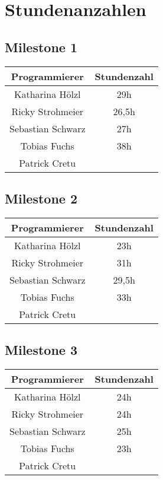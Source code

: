 \chapter{Stundenanzahlen}
\section{Milestone 1}
\begin{center}
	\begin{tabular}{|c|c|}
		\hline \textbf{Programmierer} & \textbf{Stundenzahl} \\ 
		\hline Katharina Hölzl  & 29h \\ 
		\hline Ricky Strohmeier & 26,5h \\ 
		\hline Sebastian Schwarz & 27h \\ 
		\hline Tobias Fuchs &  38h\\ 
		\hline Patrick Cretu &  \\ 
		\hline 
	\end{tabular}
\end{center} 
\section{Milestone 2}
\begin{center}
	\begin{tabular}{|c|c|}
		\hline \textbf{Programmierer} & \textbf{Stundenzahl} \\ 
		\hline Katharina Hölzl  & 23h  \\ 
		\hline Ricky Strohmeier & 31h\\ 
		\hline Sebastian Schwarz & 29,5h \\ 
		\hline Tobias Fuchs & 33h \\ 
		\hline Patrick Cretu &  \\ 
		\hline 
	\end{tabular}
\end{center} 
\section{Milestone 3}
\begin{center}
	\begin{tabular}{|c|c|}
		\hline \textbf{Programmierer} & \textbf{Stundenzahl} \\ 
		\hline Katharina Hölzl  & 24h \\ 
		\hline Ricky Strohmeier & 24h\\ 
		\hline Sebastian Schwarz & 25h \\ 
		\hline Tobias Fuchs &  23h\\ 
		\hline Patrick Cretu &  \\ 
		\hline 
	\end{tabular}
\end{center} 
